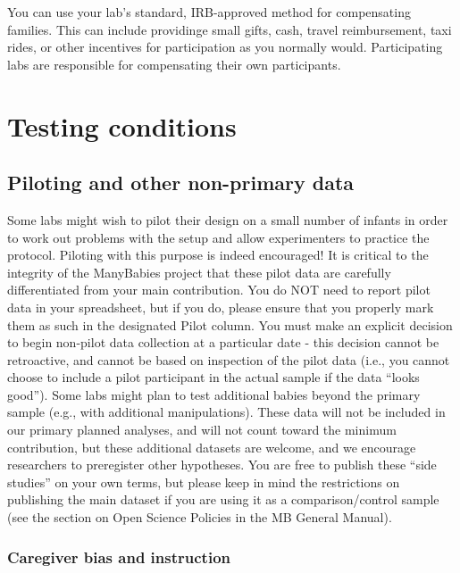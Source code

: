 \documentclass[
  letterpaper,
  DIV=11,
  numbers=noendperiod,
  oneside]{scrreprt}
\begin{document}
You can use your lab's standard, IRB-approved method for compensating
families. This can include providinge small gifts, cash, travel
reimbursement, taxi rides, or other incentives for participation as you
normally would. Participating labs are responsible for compensating
their own participants.

\chapter{Testing conditions}\label{sec-test-conditions}

\section{Piloting and other non-primary
data}\label{piloting-and-other-non-primary-data}

Some labs might wish to pilot their design on a small number of infants
in order to work out problems with the setup and allow experimenters to
practice the protocol. Piloting with this purpose is indeed encouraged!
It is critical to the integrity of the ManyBabies project that these
pilot data are carefully differentiated from your main contribution. You
do NOT need to report pilot data in your spreadsheet, but if you do,
please ensure that you properly mark them as such in the designated
Pilot column. You must make an explicit decision to begin non-pilot data
collection at a particular date - this decision cannot be retroactive,
and cannot be based on inspection of the pilot data (i.e., you cannot
choose to include a pilot participant in the actual sample if the data
``looks good''). Some labs might plan to test additional babies beyond
the primary sample (e.g., with additional manipulations). These data
will not be included in our primary planned analyses, and will not count
toward the minimum contribution, but these additional datasets are
welcome, and we encourage researchers to preregister other hypotheses.
You are free to publish these ``side studies'' on your own terms, but
please keep in mind the restrictions on publishing the main dataset if
you are using it as a comparison/control sample (see the section on Open
Science Policies in the MB General Manual).

\subsection{Caregiver bias and
instruction}\label{caregiver-bias-and-instruction}
\end{document}
